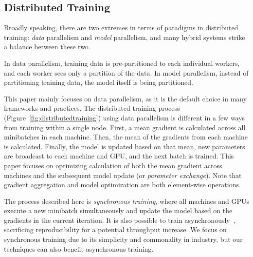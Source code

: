 \subsection{Distributed Training}
Broadly speaking, there are two extremes in terms of paradigms in distributed training: \textit{data} parallelism and \textit{model} parallelism, and many hybrid systems strike a balance between these two.

In data parallelism, training data is pre-partitioned to each individual workers, and each worker sees only a partition of the data. In model parallelism, instead of partitioning training data, the model itself is being partitioned.%

This paper mainly focuses on data parallelism, as it is the default choice in many frameworks and practices. The distributed training process (Figure~\ref{fig:distributedtraining}) using data parallelism is different in a few ways from training within a single node.
First, a mean gradient is calculated across all minibatches in each machine. Then, the mean of the gradients from each machine is calculated. Finally, the model is updated based on that mean, new parameters are broadcast to each machine and GPU, and the next batch is trained. This paper focuses on optimizing calculation of both the mean gradient across machines and the subsequent model update (or \textit{parameter exchange}). Note that gradient aggregation and model optimization are both element-wise operations.


The process described here is \textit{synchronous training}, where all machines and GPUs execute a new minibatch simultaneously and update the model based on the gradients in the current iteration. It is also possible to train asynchronously~\cite{tensorflow,revisitSGD,GeePS,recht2011hogwild,projectAdam,googleDNN}, sacrificing reproducibility for a potential throughput increase. %
We focus on synchronous training due to its simplicity and commonality in industry, but our techniques can also benefit asynchronous training.

